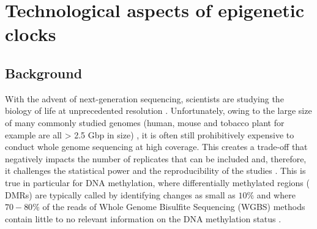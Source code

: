 
\chapter{Technological aspects of epigenetic clocks}

\ifpdf
	\graphicspath{{Chapter4/Figs/pdf/}}
\else
	\graphicspath{{Chapter4/Figs/svg/}}
\fi

\section{Background}

\smallskip

With the advent of next-generation sequencing, scientists are studying the biology of life at unprecedented resolution \cite{Shendure2008}. Unfortunately, owing to the large size of many commonly studied genomes (human, mouse and tobacco plant for example are all > 2.5 \acrshort{Gbp} in size) \cite{Consortium2001,Consortium2002,Sierro2014}, it is often still prohibitively expensive to conduct whole genome sequencing at high coverage. This creates a trade-off that negatively impacts the number of replicates that can be included and, therefore, it challenges the statistical power and the reproducibility of the studies \cite{Fumagalli2013,Wu2015}. This is true in particular for \acrshort{DNA} methylation, where differentially methylated regions ( \acrshort{DMRs}) are typically called by identifying changes as small as $10\%$ and where $70-80\%$ of the reads of Whole Genome Bisulfite Sequencing (\acrshort{WGBS}) methods contain little to no relevant information on the DNA methylation status \cite{Ziller2013}.

\bigskip

